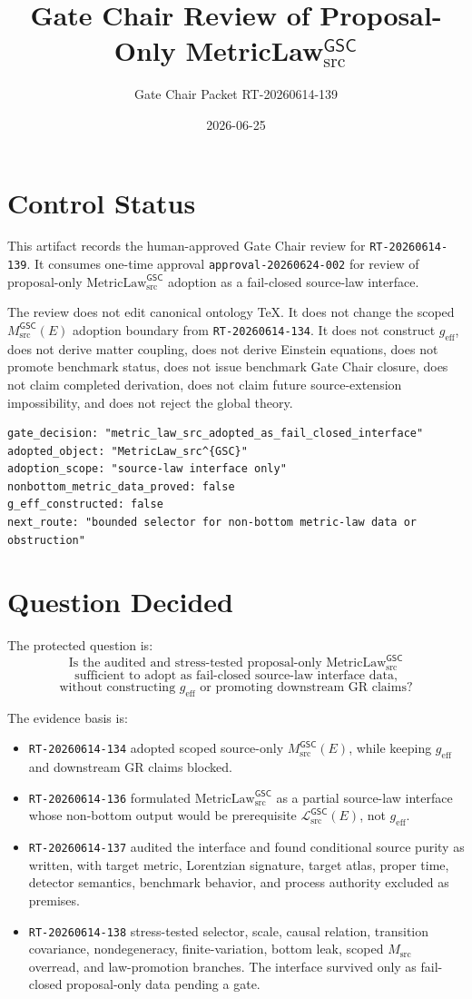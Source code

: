 \documentclass[11pt]{article}
\title{Gate Chair Review of Proposal-Only MetricLaw\(_{\mathrm{src}}^{\mathsf{GSC}}\)}
\author{Gate Chair Packet RT-20260614-139}
\date{2026-06-25}
\newcommand{\Msrc}{M_{\mathrm{src}}}
\newcommand{\MsrcGSC}{M_{\mathrm{src}}^{\mathsf{GSC}}}
\newcommand{\MetricLaw}{\mathrm{MetricLaw}_{\mathrm{src}}^{\mathsf{GSC}}}
\newcommand{\MetricData}{\mathcal{L}_{\mathrm{src}}^{\mathsf{GSC}}}
\newcommand{\geff}{g_{\mathrm{eff}}}
\begin{document}
\maketitle

\section{Control Status}

This artifact records the human-approved Gate Chair review for
\texttt{RT-20260614-139}. It consumes one-time approval
\texttt{approval-20260624-002} for review of proposal-only \(\MetricLaw\)
adoption as a fail-closed source-law interface.

The review does not edit canonical ontology TeX. It does not change the
scoped \(\MsrcGSC(E)\) adoption boundary from \texttt{RT-20260614-134}. It
does not construct \(\geff\), does not derive matter coupling, does not
derive Einstein equations, does not promote benchmark status, does not issue
benchmark Gate Chair closure, does not claim completed derivation, does not
claim future source-extension impossibility, and does not reject the global
theory.

\begin{verbatim}
gate_decision: "metric_law_src_adopted_as_fail_closed_interface"
adopted_object: "MetricLaw_src^{GSC}"
adoption_scope: "source-law interface only"
nonbottom_metric_data_proved: false
g_eff_constructed: false
next_route: "bounded selector for non-bottom metric-law data or obstruction"
\end{verbatim}

\section{Question Decided}

The protected question is:
\[
\text{Is the audited and stress-tested proposal-only }\MetricLaw
\]
\[
\text{sufficient to adopt as fail-closed source-law interface data,}
\]
\[
\text{without constructing }\geff\text{ or promoting downstream GR claims?}
\]

The evidence basis is:
\begin{itemize}[leftmargin=*]
  \item \texttt{RT-20260614-134} adopted scoped source-only
  \(\MsrcGSC(E)\), while keeping \(\geff\) and downstream GR claims blocked.
  \item \texttt{RT-20260614-136} formulated \(\MetricLaw\) as a partial
  source-law interface whose non-bottom output would be prerequisite
  \(\MetricData(E)\), not \(\geff\).
  \item \texttt{RT-20260614-137} audited the interface and found conditional
  source purity as written, with target metric, Lorentzian signature, target
  atlas, proper time, detector semantics, benchmark behavior, and process
  authority excluded as premises.
  \item \texttt{RT-20260614-138} stress-tested selector, scale, causal
  relation, transition covariance, nondegeneracy, finite-variation, bottom
  leak, scoped \(\Msrc\) overread, and law-promotion branches. The interface
  survived only as fail-closed proposal-only data pending a gate.
\end{itemize}
\end{document}
